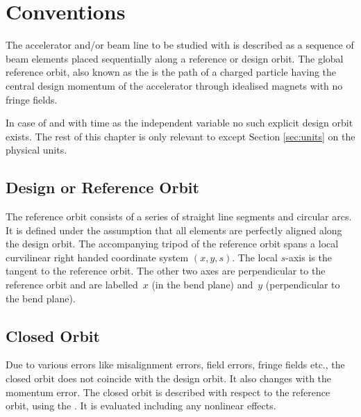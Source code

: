 \chapter{Conventions}

\label{chp:definitions}
The accelerator and/or beam line to be studied with \opalmap is described as
a sequence of beam elements placed sequentially along a reference or
design orbit.
The global reference orbit, also known as the  
is the path of a charged particle having the central design momentum 
of the accelerator through idealised magnets with no fringe fields.

In case of \opalt and \opalcycl with time as the independent variable no such 
explicit design orbit exists. The rest of this chapter is only relevant to 
\opalmap except Section \ref{sec:units} on the physical units. 


\section{Design or Reference Orbit}
The reference orbit consists of a series of
straight line segments and circular arcs.
It is defined under the assumption that all elements are
perfectly aligned along the design orbit.
The accompanying tripod of the reference orbit spans
a local curvilinear right handed coordinate system $(x,y,s)$.
The local $s$-axis is the tangent to the reference orbit.
The other two axes are perpendicular to the reference orbit and
are labelled~$x$ (in the bend plane)
and~$y$ (perpendicular to the bend plane).

\section{Closed Orbit}
Due to various errors like misalignment errors, field errors,
fringe fields etc.,
the closed orbit does not coincide with the design orbit.
It also changes with the momentum error.
The closed orbit is described with respect to the reference orbit, 
using the .
It is evaluated including any nonlinear effects.

